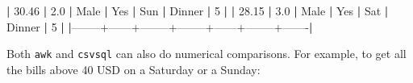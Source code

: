 \documentclass[
]{book}
\newenvironment{Shaded}{\begin{snugshade}}{\end{snugshade}}
\newcommand{\ExtensionTok}[1]{#1}
\newcommand{\KeywordTok}[1]{\textcolor[rgb]{0.13,0.29,0.53}{\textbf{#1}}}
\theoremstyle{definition}
\theoremstyle{definition}
\theoremstyle{definition}
\theoremstyle{remark}
\begin{document}
\begin{Shaded}
\begin{Highlighting}[]
\KeywordTok{|}  \ExtensionTok{30.46} \KeywordTok{|} \ExtensionTok{2.0}  \KeywordTok{|} \ExtensionTok{Male}   \KeywordTok{|} \ExtensionTok{Yes}    \KeywordTok{|} \ExtensionTok{Sun}  \KeywordTok{|} \ExtensionTok{Dinner} \KeywordTok{|} \ExtensionTok{5}     \KeywordTok{|}
\KeywordTok{|}  \ExtensionTok{28.15} \KeywordTok{|} \ExtensionTok{3.0}  \KeywordTok{|} \ExtensionTok{Male}   \KeywordTok{|} \ExtensionTok{Yes}    \KeywordTok{|} \ExtensionTok{Sat}  \KeywordTok{|} \ExtensionTok{Dinner} \KeywordTok{|} \ExtensionTok{5}     \KeywordTok{|}
\KeywordTok{|}\ExtensionTok{--------+------+--------+--------+------+--------+-------}\KeywordTok{|}
\end{Highlighting}
\end{Shaded}

Both \texttt{awk} and \texttt{csvsql} can also do numerical comparisons. For example, to get all the bills above 40 USD on a Saturday or a Sunday:
\end{document}
